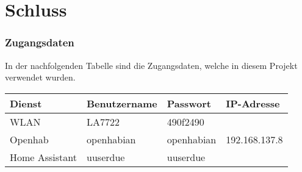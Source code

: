 \section{Schluss}\label{sec:Schluss}
\subsubsection{Zugangsdaten}
In der nachfolgenden Tabelle sind die Zugangsdaten, welche in diesem Projekt verwendet wurden.

\begin{table}[H]
	\centering
	\begin{tabular}{|l|l|l|l|}
		\hline 
		Dienst & Benutzername & Passwort & IP-Adresse \\ 
		\hline 
		WLAN & LA7722 & 490f2490 &  \\ 
		\hline 
		Openhab & openhabian & openhabian & 192.168.137.8 \\ 
		\hline 
		Home Assistant & uuserdue & uuserdue &  \\ 
		\hline 
	\end{tabular} 
\end{table}






